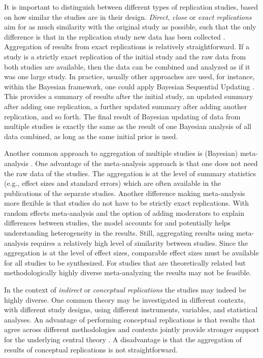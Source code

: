 \documentclass[11pt,reqno]{article}
\begin{document}
It is important to distinguish between different types of replication studies, based on how similar the studies are in their design. \textit{Direct}, \textit{close} or \textit{exact replications} aim for as much similarity with the original study as possible, such that the only difference is that in the replication study new data has been collected \citep{simons_direct_2014, brandt_et_al_replication_2014}. Aggregation of results from exact replications is relatively straightforward. If a study is a strictly exact replication of the initial study and the raw data from both studies are available, then the data can be combined and analyzed as if it was one large study. In practice, usually other approaches are used, for instance, within the Bayesian framework, one could apply Bayesian Sequential Updating \citep[BSU;][]{schonbrodt_sequential_2017}. This provides a summary of results after the initial study, an updated summary after adding one replication, a further updated summary after adding another replication, and so forth. The final result of Bayesian updating of data from multiple studies is exactly the same as the result of one Bayesian analysis of all data combined, as long as the same initial prior is used.

Another common approach to aggregation of multiple studies is (Bayesian) meta-analysis \citep[see][]{lipsey_wilson_2001, sutton_bayesian_meta2001}. One advantage of the meta-analysis approach is that one does not need the raw data of the studies. The aggregation is at the level of summary statistics (e.g., effect sizes and standard errors) which are often available in the publications of the separate studies. Another difference making meta-analysis more flexible is that studies do not have to be strictly exact replications. With random effects meta-analysis and the option of adding moderators to explain differences between studies, the model accounts for and potentially helps understanding heterogeneity in the results. Still, aggregating results using meta-analysis requires a relatively high level of similarity between studies. Since the aggregation is at the level of effect sizes, comparable effect sizes must be available for all studies to be synthesized. For studies that are theoretically related but methodologically highly diverse meta-analyzing the results may not be feasible.

In the context of \textit{indirect} or \textit{conceptual replications} the studies may indeed be highly diverse. One common theory may be investigated in different contexts, with different study designs, using different instruments, variables, and statistical analyses. An advantage of performing conceptual replications is that results that agree across different methodologies and contexts jointly provide stronger support for the underlying central theory \citep{crandall_conceptual_2016, lawlor_triangulation_2017, nosek_scientific_2012}. A disadvantage is that the aggregation of results of conceptual replications is not straightforward.
\end{document}
